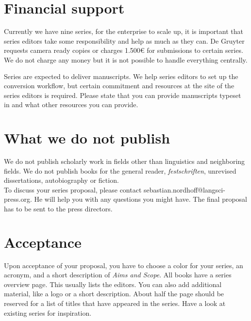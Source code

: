 

\section{Financial support}

Currently we have nine series, for the enterprise to scale up, it is important that series editors
take some responsibility and help as much as they can. De Gruyter requests camera ready copies or
charges 1.500€ for submissions to certain series. We do not charge any money but it is not possible
to handle everything centrally.

Series are expected to deliver \latex manuscripts. We help series editors to set up the conversion
workflow, but certain commitment and resources at the site of the series editors is required. Please
state that you can provide manuscripts typeset in \latex and what other resources you can provide.


\section{What we do not publish}

We do not publish scholarly work in fields other than linguistics
and neighboring fields. We do not publish books for the general reader,
\textit{festschriften}, unrevised dissertations, autobiography or
fiction.\\


To discuss your series proposal, please contact sebastian.nordhoff@langsci-press.org.  He will help you with any questions you might have. The final proposal has to be sent to the press directors.



\section{Acceptance}
Upon acceptance of your proposal, you have to choose a color for your series, an acronym, and a short description of \emph{Aims and Scope}.
All books have a series overview page. This usually lists the editors. You can also add additional material, like a logo or a short description. About half the page should be reserved for a list of titles that have appeared in the series. Have a look at existing series for inspiration.

